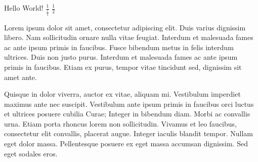 \documentclass{article}
\newcommand{\oneby}[1]{\frac 1{#1}}
\begin{document}
Hello World!
$\oneby{\oneby{1}}$
$\frac    {1}
2$

Lorem ipsum dolor sit amet, consectetur adipiscing elit. Duis varius dignissim libero. Nam sollicitudin ornare nulla vitae feugiat. Interdum et malesuada fames ac ante ipsum primis in faucibus. Fusce bibendum metus in felis interdum ultrices. Duis non justo purus. Interdum et malesuada fames ac ante ipsum primis in faucibus. Etiam ex purus, tempor vitae tincidunt sed, dignissim sit amet ante.

Quisque in dolor viverra, auctor ex vitae, aliquam mi. Vestibulum imperdiet maximus ante nec suscipit. Vestibulum ante ipsum primis in faucibus orci luctus et ultrices posuere cubilia Curae; Integer in bibendum diam. Morbi ac convallis urna. Etiam porta rhoncus lorem non sollicitudin. Vivamus et leo faucibus, consectetur elit convallis, placerat augue. Integer iaculis blandit tempor. Nullam eget dolor massa. Pellentesque posuere ex eget massa accumsan dignissim. Sed eget sodales eros.
\end{document}
